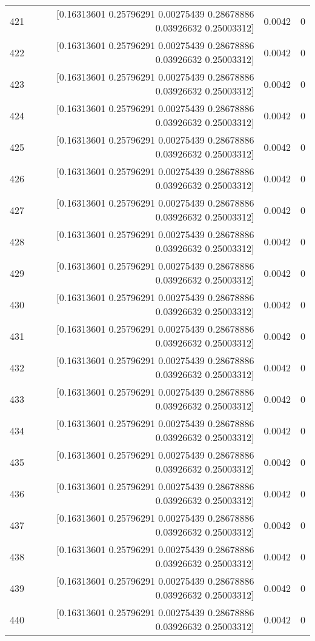 \begin{longtable}{lrrr}
421 & [0.16313601 0.25796291 0.00275439 0.28678886 0.03926632 0.25003312] & 0.0042 & 0 \\
422 & [0.16313601 0.25796291 0.00275439 0.28678886 0.03926632 0.25003312] & 0.0042 & 0 \\
423 & [0.16313601 0.25796291 0.00275439 0.28678886 0.03926632 0.25003312] & 0.0042 & 0 \\
424 & [0.16313601 0.25796291 0.00275439 0.28678886 0.03926632 0.25003312] & 0.0042 & 0 \\
425 & [0.16313601 0.25796291 0.00275439 0.28678886 0.03926632 0.25003312] & 0.0042 & 0 \\
426 & [0.16313601 0.25796291 0.00275439 0.28678886 0.03926632 0.25003312] & 0.0042 & 0 \\
427 & [0.16313601 0.25796291 0.00275439 0.28678886 0.03926632 0.25003312] & 0.0042 & 0 \\
428 & [0.16313601 0.25796291 0.00275439 0.28678886 0.03926632 0.25003312] & 0.0042 & 0 \\
429 & [0.16313601 0.25796291 0.00275439 0.28678886 0.03926632 0.25003312] & 0.0042 & 0 \\
430 & [0.16313601 0.25796291 0.00275439 0.28678886 0.03926632 0.25003312] & 0.0042 & 0 \\
431 & [0.16313601 0.25796291 0.00275439 0.28678886 0.03926632 0.25003312] & 0.0042 & 0 \\
432 & [0.16313601 0.25796291 0.00275439 0.28678886 0.03926632 0.25003312] & 0.0042 & 0 \\
433 & [0.16313601 0.25796291 0.00275439 0.28678886 0.03926632 0.25003312] & 0.0042 & 0 \\
434 & [0.16313601 0.25796291 0.00275439 0.28678886 0.03926632 0.25003312] & 0.0042 & 0 \\
435 & [0.16313601 0.25796291 0.00275439 0.28678886 0.03926632 0.25003312] & 0.0042 & 0 \\
436 & [0.16313601 0.25796291 0.00275439 0.28678886 0.03926632 0.25003312] & 0.0042 & 0 \\
437 & [0.16313601 0.25796291 0.00275439 0.28678886 0.03926632 0.25003312] & 0.0042 & 0 \\
438 & [0.16313601 0.25796291 0.00275439 0.28678886 0.03926632 0.25003312] & 0.0042 & 0 \\
439 & [0.16313601 0.25796291 0.00275439 0.28678886 0.03926632 0.25003312] & 0.0042 & 0 \\
440 & [0.16313601 0.25796291 0.00275439 0.28678886 0.03926632 0.25003312] & 0.0042 & 0 \\

\end{longtable}

